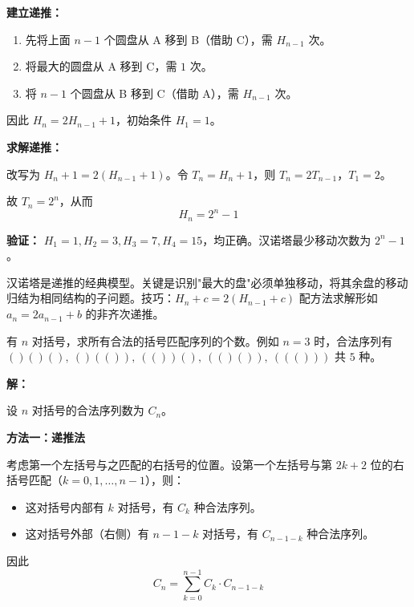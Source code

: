 \documentclass[12pt, a4paper]{ctexart}
\begin{document}
\textbf{建立递推：}
\begin{enumerate}[leftmargin=1.5em]
  \item 先将上面 \(n-1\) 个圆盘从 A 移到 B（借助 C），需 \(H_{n-1}\) 次。
  \item 将最大的圆盘从 A 移到 C，需 \(1\) 次。
  \item 将 \(n-1\) 个圆盘从 B 移到 C（借助 A），需 \(H_{n-1}\) 次。
\end{enumerate}

因此 \(H_n = 2H_{n-1} + 1\)，初始条件 \(H_1 = 1\)。

\textbf{求解递推：}

改写为 \(H_n + 1 = 2(H_{n-1}+1)\)。令 \(T_n = H_n+1\)，则 \(T_n = 2T_{n-1}\)，\(T_1 = 2\)。

故 \(T_n = 2^n\)，从而
\[
H_n = 2^n - 1
\]

\textbf{验证：} \(H_1=1, H_2=3, H_3=7, H_4=15\)，均正确。汉诺塔最少移动次数为 \(\boxed{2^n-1}\)。

\begin{tipbox}[方法总结]
汉诺塔是递推的经典模型。关键是识别"最大的盘"必须单独移动，将其余盘的移动归结为相同结构的子问题。技巧：\(H_n+c = 2(H_{n-1}+c)\) 配方法求解形如 \(a_n = 2a_{n-1}+b\) 的非齐次递推。
\end{tipbox}

\vspace{6pt}

\begin{examplebox}
有 \(n\) 对括号，求所有合法的括号匹配序列的个数。例如 \(n=3\) 时，合法序列有 \(()()(),\ ()(()),\ (())(),\ (()()),\ ((()))\) 共 \(5\) 种。
\end{examplebox}

\textbf{解：}

设 \(n\) 对括号的合法序列数为 \(C_n\)。

\textbf{方法一：递推法}

考虑第一个左括号与之匹配的右括号的位置。设第一个左括号与第 \(2k+2\) 位的右括号匹配（\(k=0,1,\ldots,n-1\)），则：
\begin{itemize}[leftmargin=1.5em]
  \item 这对括号内部有 \(k\) 对括号，有 \(C_k\) 种合法序列。
  \item 这对括号外部（右侧）有 \(n-1-k\) 对括号，有 \(C_{n-1-k}\) 种合法序列。
\end{itemize}

因此
\[
C_n = \sum_{k=0}^{n-1} C_k \cdot C_{n-1-k}
\]
\end{document}
